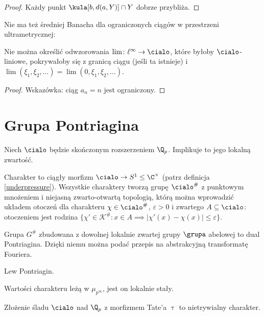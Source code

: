 \begin{proof}
	Każdy punkt $\kula[b, d(a,Y)] \cap Y$ dobrze przybliża.
\end{proof}

Nie ma też średniej Banacha dla ograniczonych ciągów w przestrzeni ultrametrycznej:%

\begin{fakt}
	Nie  można określić odwzorowania $\lim \colon \ell^\infty \to \cialo$, które byłoby $\cialo$-liniowe, pokrywałoby się z granicą ciągu (jeśli ta istnieje) i $\lim(\xi_1, \xi_2, \ldots) = \lim(0, \xi_1, \xi_2, \ldots)$.
\end{fakt}

\begin{proof}
	Wskazówka: ciąg $a_n = n$ jest ograniczony.
\end{proof}

\section{Grupa Pontriagina}
Niech $\cialo$ będzie skończonym rozszerzeniem $\Q_p$.
Implikuje to jego lokalną zwartość.

\begin{definicja}
	Charakter to ciągły morfizm $\cialo \to S^1 \le \C^\times$ (patrz definicja \ref{underpressure}).
	Wszystkie charaktery tworzą grupę $\cialo^\#$ z punktowym mnożeniem i niejasną zwarto-otwartą topologią, którą można wprowadzić układem otoczeń dla charakteru $\chi \in \cialo^\#$, $\varepsilon > 0$ i zwartego $A \subseteq \cialo$: otoczeniem jest rodzina $\{\chi' \in \mathcal K^\#: x \in A \implies |\chi'(x) - \chi(x)| \le \varepsilon\}$.
\end{definicja}

Grupa $G^\#$ zbudowana z dowolnej lokalnie zwartej grupy $\grupa$ abelowej to dual Pontriagina.
Dzięki niemu można podać przepis na abstrakcyjną transformatę Fouriera.

\begin{historia}
	Lew Pontriagin.
\end{historia}

\begin{fakt}
	Wartości charakteru leżą w $\mu_{p^\infty}$, jest on lokalnie stały.
\end{fakt}

\begin{przyklad}
	Złożenie śladu $\cialo$ nad $\Q_p$ z morfizmem Tate'a $\uptau$ to nietrywialny charakter.
\end{przyklad}

